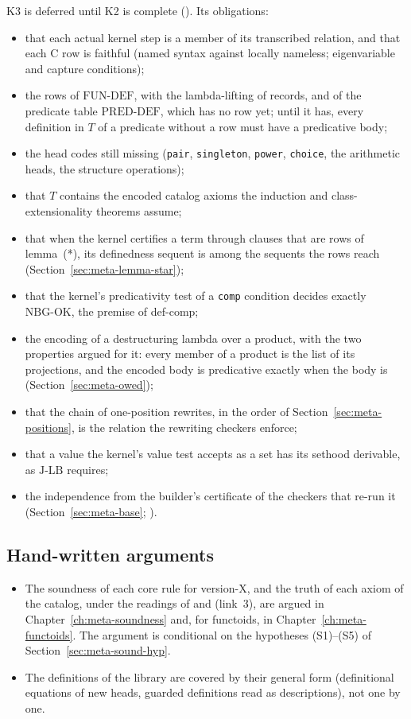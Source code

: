 K3 is deferred until K2 is complete ().  Its obligations:
\begin{itemize}
\item that each actual kernel step is a member of its transcribed
  relation, and that each C row is faithful (named syntax against locally
  nameless; eigenvariable and capture conditions);
\item the rows of $\mathrm{FUN\text{-}DEF}$, with the lambda-lifting of
  records, and of the predicate table $\mathrm{PRED\text{-}DEF}$, which has
  no row yet; until it has, every definition in $T$ of a predicate without
  a row must have a predicative body;
\item the head codes still missing (\texttt{pair}, \texttt{singleton},
  \texttt{power}, \texttt{choice}, the arithmetic heads, the structure
  operations);
\item that $T$ contains the encoded catalog axioms the induction and
  class-extensionality theorems assume;
\item that when the kernel certifies a term through clauses that are
  rows of lemma~(*), its definedness sequent is among the sequents the
  rows reach (Section~\ref{sec:meta-lemma-star});
\item that the kernel's predicativity test of a \texttt{comp} condition
  decides exactly $\mathrm{NBG\text{-}OK}$, the premise of def-comp;
\item the encoding of a destructuring lambda over a product, with the
  two properties argued for it: every member of a product is the list of
  its projections, and the encoded body is predicative exactly when the
  body is (Section~\ref{sec:meta-owed});
\item that the chain of one-position rewrites, in the order of
  Section~\ref{sec:meta-positions}, is the relation the rewriting
  checkers enforce;
\item that a value the kernel's value test accepts as a set has its
  sethood derivable, as $\mathrm{J\text{-}LB}$ requires;
\item the independence from the builder's certificate of the checkers
  that re-run it (Section~\ref{sec:meta-base}; ).
\end{itemize}

\subsection{Hand-written arguments}

\begin{itemize}
\item The soundness of each core rule for version-X, and the truth of
  each axiom of the catalog, under the readings of  and 
  (link~3), are argued in Chapter~\ref{ch:meta-soundness} and, for
  functoids, in Chapter~\ref{ch:meta-functoids}.  The argument is
  conditional on the hypotheses (S1)--(S5) of
  Section~\ref{sec:meta-sound-hyp}.
\item The definitions of the library are covered by their general form
  (definitional equations of new heads, guarded definitions read as
  descriptions), not one by one.
\end{itemize}


